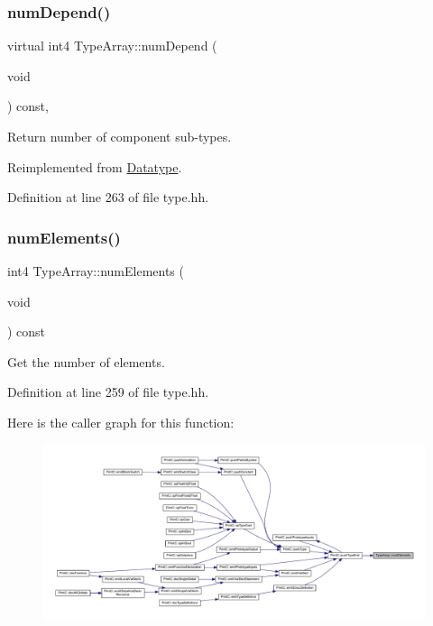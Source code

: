 \subsubsection{\texorpdfstring{numDepend()}{numDepend()}}
{\footnotesize\ttfamily virtual int4 Type\+Array\+::num\+Depend (\begin{DoxyParamCaption}\item[{void}]{ }\end{DoxyParamCaption}) const\hspace{0.3cm}{\ttfamily [inline]}, {\ttfamily [virtual]}}



Return number of component sub-\/types. 



Reimplemented from \mbox{\hyperlink{class_datatype_ad29076ac4c3a28363df8f700c6fe4ffd}{Datatype}}.



Definition at line 263 of file type.\+hh.

\mbox{\label{class_type_array_af8a598d1ee0bc8966c5ceaa72d08027d}} 
\subsubsection{\texorpdfstring{numElements()}{numElements()}}
{\footnotesize\ttfamily int4 Type\+Array\+::num\+Elements (\begin{DoxyParamCaption}\item[{void}]{ }\end{DoxyParamCaption}) const\hspace{0.3cm}{\ttfamily [inline]}}



Get the number of elements. 



Definition at line 259 of file type.\+hh.

Here is the caller graph for this function\+:
\nopagebreak
\begin{figure}[H]
\begin{center}
\leavevmode
\includegraphics[width=350pt]{class_type_array_af8a598d1ee0bc8966c5ceaa72d08027d_icgraph}
\end{center}
\end{figure}
\mbox{\label{class_type_array_aa3c9c83ca86e94bb58772d9933d88617}} 

